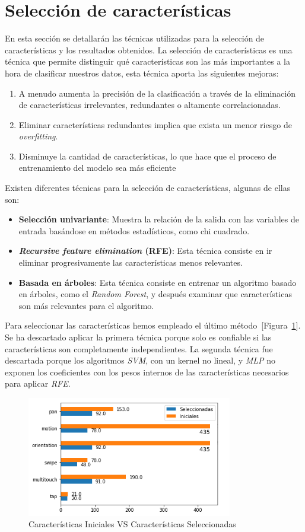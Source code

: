 \newpage


\section{Selección de características}
\label{sec:sel_cara}
En esta sección se detallarán las técnicas utilizadas para la selección de características y los resultados obtenidos. La selección de características es una técnica que permite distinguir qué características son las más importantes a la hora de clasificar nuestros datos, esta técnica aporta las siguientes mejoras:

\begin{enumerate}
    \item A menudo aumenta la precisión de la clasificación a través de la eliminación de características irrelevantes, redundantes o altamente correlacionadas.
    \item Eliminar características redundantes implica que exista un menor riesgo de \textit{overfitting}.
    \item Disminuye la cantidad de características, lo que hace que el proceso de entrenamiento del modelo sea más eficiente
\end{enumerate}

Existen diferentes técnicas para la selección de características, algunas de ellas son:

\begin{itemize}
    \item \textbf{Selección univariante}: Muestra la relación de la salida con las variables  de entrada basándose en métodos estadísticos, como chi cuadrado.
    \item \textbf{\textit{Recursive feature elimination} (RFE)}: Esta técnica consiste en ir eliminar progresivamente las características menos relevantes.
    \item \textbf{Basada en árboles}: Esta técnica consiste en entrenar un algoritmo basado en árboles, como el \textit{Random Forest}, y después examinar que características son más relevantes para el algoritmo.
\end{itemize}

Para seleccionar las características hemos empleado el último método~[Figura~\ref{fig:origianlvsselected}]. 
Se ha descartado aplicar la primera técnica porque solo es confiable si las características son completamente independientes. La segunda técnica fue descartada porque los algoritmos \textit{SVM}, con un kernel no lineal, y \textit{MLP} no exponen los coeficientes con los pesos internos de las características necesarios para aplicar \textit{RFE}. 

\begin{figure}[h]
\centering
\includegraphics[width=0.8\textwidth]{imaxes/plots/selectedvsoriginal_features.png}
\caption{Características Iniciales VS Características Seleccionadas}
\label{fig:origianlvsselected}
\end{figure}


